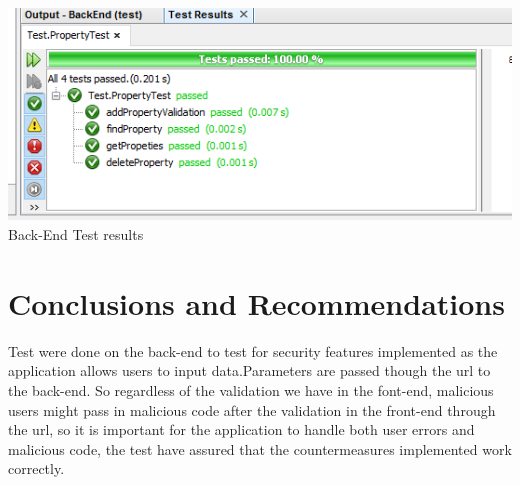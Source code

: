 \documentclass[a4paper,12pt]{article}
\begin{document}
\includegraphics[width=1\textwidth]{./Images/testResults.png}\\
Back-End Test results \\


\section{Conclusions and Recommendations}
Test were done on the back-end to test for security features implemented as the application allows users to input data.Parameters are passed though the url to the back-end. So regardless of the validation we have in the font-end, malicious users might pass in  malicious code after the validation in the front-end through the url, so it is important for the application to handle both user errors and malicious code, the test have assured that the countermeasures implemented work correctly.
\end{document}

